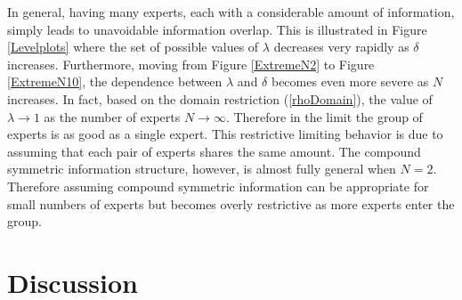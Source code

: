 \documentclass[11pt]{article}
\theoremstyle{definition}
\theoremstyle{definition}
\begin{document}
In general, having many experts, each with a considerable amount of information, simply leads to unavoidable information overlap. This is illustrated in Figure \ref{Levelplots} where the set of possible values of $\lambda$ decreases very rapidly as $\delta$ increases. Furthermore, moving from Figure \ref{ExtremeN2} to Figure \ref{ExtremeN10}, the dependence between $\lambda$ and $\delta$ becomes even more severe as $N$ increases. In fact, based on the domain restriction  (\ref{rhoDomain}), the value of $\lambda \to 1$ as the number of experts $N \to \infty$. Therefore in the limit the group of experts is as good as a single expert. This restrictive limiting behavior is due to assuming that each pair of experts shares the same amount. The compound symmetric information structure, however, is almost fully general when $N = 2$. Therefore assuming compound symmetric information can be appropriate for small numbers of experts but becomes overly restrictive as more experts enter the group. 


\section{Discussion}



\end{document}
